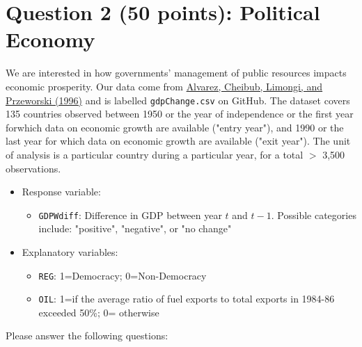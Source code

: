 \documentclass[12pt,letterpaper]{article}
\begin{document}
\section*{Question 2 (50 points): Political Economy}
\vspace{.25cm}
\noindent We are interested in how governments' management of public resources impacts economic prosperity. Our data come from \href{https://www.researchgate.net/profile/Adam_Przeworski/publication/240357392_Classifying_Political_Regimes/links/0deec532194849aefa000000/Classifying-Political-Regimes.pdf}{Alvarez, Cheibub, Limongi, and Przeworski (1996)} and is labelled \texttt{gdpChange.csv} on GitHub. The dataset covers 135 countries observed between 1950 or the year of independence or the first year forwhich data on economic growth are available ("entry year"), and 1990 or the last year for which data on economic growth are available ("exit year"). The unit of analysis is a particular country during a particular year, for a total $>$ 3,500 observations. 

\begin{itemize}
	\item
	Response variable: 
	\begin{itemize}
		\item \texttt{GDPWdiff}: Difference in GDP between year $t$ and $t-1$. Possible categories include: "positive", "negative", or "no change"
	\end{itemize}
	\item
	Explanatory variables: 
	\begin{itemize}
		\item
		\texttt{REG}: 1=Democracy; 0=Non-Democracy
		\item
		\texttt{OIL}: 1=if the average ratio of fuel exports to total exports in 1984-86 exceeded 50\%; 0= otherwise
	\end{itemize}
	
\end{itemize}

\noindent Please answer the following questions:
\end{document}
